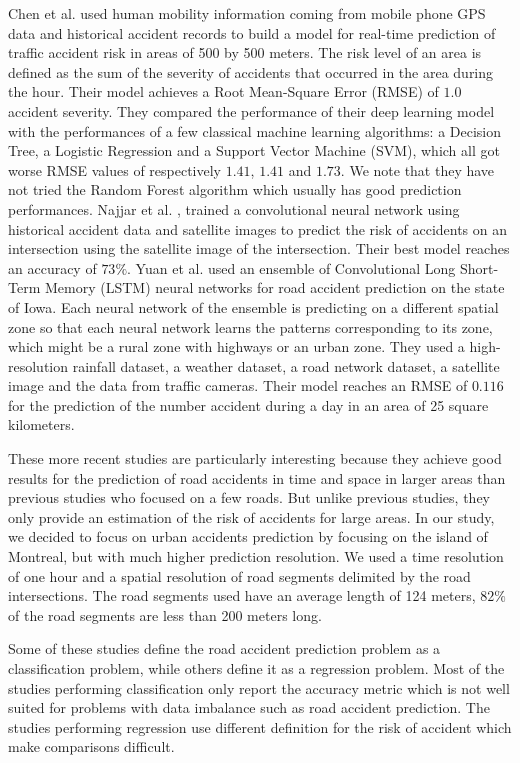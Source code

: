 \documentclass[conference]{IEEEtran}
\begin{document}
Chen et al. \cite{QChen2016} used human mobility information coming from
mobile phone GPS data and historical accident records to build a model for
real-time prediction of traffic accident risk in areas of 500 by 500
meters. The risk level of an area is defined as the sum of the severity of
accidents that occurred in the area during the hour. Their model achieves
a Root Mean-Square Error (RMSE) of $1.0$ accident severity. They compared the performance of their deep learning
model with the performances of a few classical machine learning
algorithms: a Decision Tree, a Logistic Regression and a Support Vector
Machine (SVM), which all got worse RMSE values of respectively $1.41$,
$1.41$ and $1.73$. We note that they have not tried the Random
Forest algorithm which usually has good prediction performances. Najjar et
al. \cite{Najjar2017}, trained a convolutional neural network using
historical accident data and satellite images to predict the risk of
accidents on an intersection using the satellite image of the intersection.
Their best model reaches an accuracy of $73\%$. Yuan et al. \cite{Yuan2018}
used an ensemble of Convolutional Long Short-Term Memory (LSTM) neural
networks for road accident prediction on the state of Iowa. Each neural
network of the ensemble is predicting on a different spatial zone so that
each neural network learns the patterns corresponding to its zone, which
might be a rural zone with highways or an urban zone. They used a
high-resolution rainfall dataset, a weather dataset, a road network
dataset, a satellite image and the data from traffic cameras. Their model
reaches an RMSE of $0.116$ for the prediction of the number accident during
a day in an area of 25 square kilometers.

These more recent studies are particularly interesting because they achieve
good results for the prediction of road accidents in time and space in
larger areas than previous studies who focused on a few roads. But unlike
previous studies, they only provide an estimation of the risk of accidents
for large areas. In our study, we decided to focus on urban accidents
prediction by focusing on the island of Montreal, but with much higher
prediction resolution. We used a time resolution of one hour and a spatial
resolution of road segments delimited by the road intersections. The road
segments used have an average length of 124 meters, $82\%$ of the road
segments are less than 200 meters long.

Some of these studies define the road accident prediction problem as a 
classification problem, while others define it as a regression problem.
Most of the studies performing classification only report the accuracy
metric which is not well suited for problems with data imbalance such as
road accident prediction\cite{He2009}. The studies performing regression
use different definition for the risk of accident which make comparisons
difficult.
\end{document}

